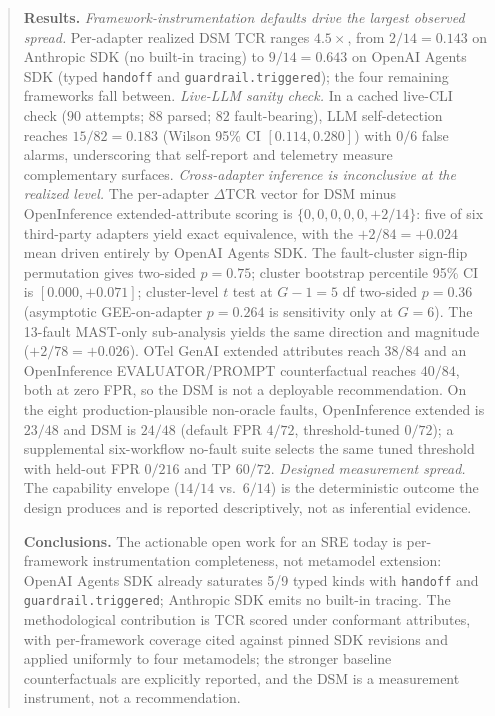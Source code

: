 \documentclass[a4paper,UKenglish,cleveref,autoref,thm-restate]{lipics-v2021}
\begin{document}
\begin{abstract}
\noindent\textbf{Results.} \emph{Framework-instrumentation defaults
drive the largest observed spread.} Per-adapter realized DSM TCR ranges
$4.5\times$, from $2/14 = 0.143$ on Anthropic SDK (no built-in
tracing) to $9/14 = 0.643$ on OpenAI Agents SDK (typed
\texttt{handoff} and \texttt{guardrail.triggered}); the four
remaining frameworks fall between. \emph{Live-LLM sanity check.}
In a cached live-CLI check ($90$ attempts; $88$ parsed; $82$
fault-bearing), LLM self-detection reaches $15/82 = 0.183$
(Wilson 95\% CI $[0.114, 0.280]$) with $0/6$ false alarms,
underscoring that self-report and telemetry measure complementary
surfaces. \emph{Cross-adapter inference is inconclusive at the
realized level.} The per-adapter $\Delta$TCR vector for DSM minus
OpenInference extended-attribute scoring is
$\{0, 0, 0, 0, 0, +2/14\}$: five of six third-party adapters yield
exact equivalence, with the $+2/84 = +0.024$ mean driven entirely
by OpenAI Agents SDK. The fault-cluster sign-flip permutation
gives two-sided $p = 0.75$; cluster bootstrap percentile 95\% CI
is $[0.000, +0.071]$; cluster-level $t$ test at $G - 1 = 5$ df two-sided $p =
0.36$ (asymptotic GEE-on-adapter $p = 0.264$ is sensitivity only at
$G = 6$). The 13-fault MAST-only sub-analysis yields the same
direction and magnitude ($+2/78 = +0.026$). OTel GenAI extended
attributes reach $38/84$ and an OpenInference EVALUATOR/PROMPT
counterfactual reaches $40/84$, both at zero FPR, so the DSM is not
a deployable recommendation. On the eight production-plausible
non-oracle faults, OpenInference extended is $23/48$ and DSM is
$24/48$ (default FPR $4/72$, threshold-tuned $0/72$); a supplemental
six-workflow no-fault suite selects the same tuned threshold with
held-out FPR $0/216$ and TP $60/72$. \emph{Designed
measurement spread.} The capability envelope ($14/14$ vs.\ $6/14$)
is the deterministic outcome the design produces and is reported
descriptively, not as inferential evidence.

\noindent\textbf{Conclusions.} The actionable open work for an SRE
today is per-framework instrumentation completeness, not metamodel
extension: OpenAI Agents SDK already saturates 5/9 typed kinds with
\texttt{handoff} and \texttt{guardrail.triggered}; Anthropic SDK
emits no built-in tracing. The methodological contribution is TCR
scored under conformant attributes, with per-framework coverage
cited against pinned SDK revisions and applied uniformly to four
metamodels; the stronger baseline counterfactuals are explicitly
reported, and the DSM is a measurement instrument, not a recommendation.
\end{abstract}
\end{document}
